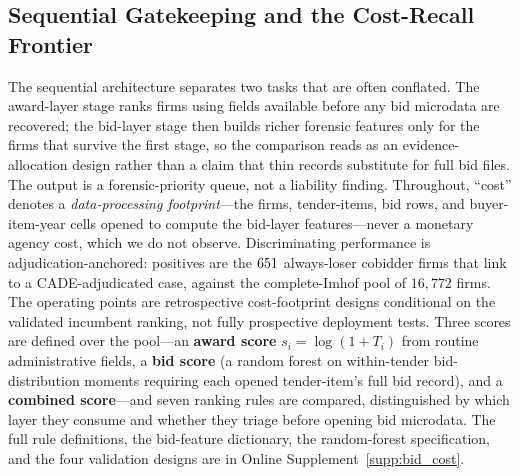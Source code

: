\subsection{Sequential Gatekeeping and the Cost-Recall Frontier}
\label{app:forensic_sequence_submission}

The sequential architecture separates two tasks that are often conflated.
The award-layer stage ranks firms using fields available before any bid
microdata are recovered; the bid-layer stage then builds richer forensic
features only for the firms that survive the first stage, so the
comparison reads as an evidence-allocation design rather than a claim that
thin records substitute for full bid files. The output is a
forensic-priority queue, not a liability finding. Throughout, ``cost''
denotes a \emph{data-processing footprint}---the firms, tender-items, bid
rows, and buyer-item-year cells opened to compute the bid-layer
features---never a monetary agency cost, which we do not observe.
Discriminating performance is adjudication-anchored: positives are the
$651$ always-loser cobidder firms that link to a CADE-adjudicated
case, against the complete-Imhof pool of $16{,}772$ firms. The operating
points are retrospective cost-footprint designs conditional on the
validated incumbent ranking, not fully prospective deployment tests. Three
scores are defined over the pool---an \textbf{award score}
$s_i=\log(1+T_i)$ from routine administrative fields, a \textbf{bid score}
(a random forest on within-tender bid-distribution moments requiring each
opened tender-item's full bid record), and a \textbf{combined score}---and
seven ranking rules are compared, distinguished by which layer they consume
and whether they triage before opening bid microdata. The full rule
definitions, the bid-feature dictionary, the random-forest specification,
and the four validation designs are in Online Supplement~\ref{supp:bid_cost}.

